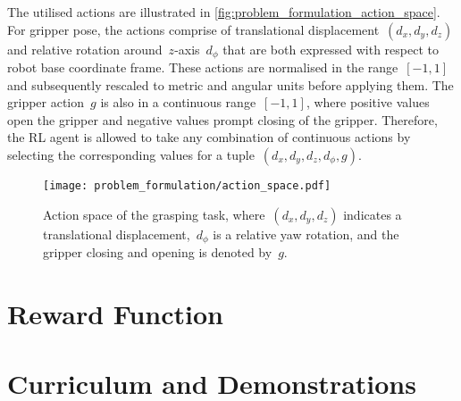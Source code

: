 The utilised actions are illustrated in \autoref{fig:problem_formulation_action_space}. For gripper pose, the actions comprise of translational displacement~\((d_{x},d_{y},d_{z})\) and relative rotation around~\(z\)-axis~\(d_{\phi}\) that are both expressed with respect to robot base coordinate frame. These actions are normalised in the range~\([-1, 1]\) and subsequently rescaled to metric and angular units before applying them. The gripper action~\(g\) is also in a continuous range~\([-1, 1]\), where positive values open the gripper and negative values prompt closing of the gripper. Therefore, the RL agent is allowed to take any combination of continuous actions by selecting the corresponding values for a tuple~\((d_{x},d_{y},d_{z},d_{\phi},g)\).

\begin{figure}[ht]
    \centering
    \texttt{[image: problem\_formulation/action\_space.pdf]}
    \caption{Action space of the grasping task, where~\((d_{x},d_{y},d_{z})\) indicates a translational displacement,~\(d_{\phi}\) is a relative yaw rotation, and the gripper closing and opening is denoted by~\(g\).}
    \label{fig:problem_formulation_action_space}
\end{figure}


\section{Reward Function}



\section{Curriculum and Demonstrations}


